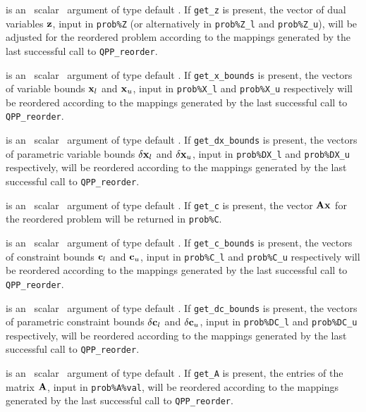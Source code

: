 \documentclass{galahad}
\newcommand{\packagename}{QPP}
\begin{document}
\begin{description}
is an \optional\ scalar \intentin\ argument of type default \logical. 
If {\tt get\_z} is present, the vector of dual variables ${\mathbf{z}}$, input in 
{\tt prob\%Z} (or alternatively in {\tt prob\%Z\_l} and {\tt prob\%Z\_u}),
will be adjusted for the reordered problem according 
to the mappings generated by the last successful 
call to {\tt \packagename\_reorder}. 
 
is an \optional\ scalar \intentin\ argument of type default \logical. 
If {\tt get\_x\_bounds} is present, 
the vectors of variable bounds ${\mathbf{x}}_l$ and 
${\mathbf{x}}_u$, input in {\tt prob\%X\_l} and {\tt prob\%X\_u} respectively
will be reordered according to the 
mappings generated by the last successful call to {\tt \packagename\_reorder}. 
 
is an \optional\ scalar \intentin\ argument of type default \logical. 
If {\tt get\_dx\_bounds} is present, 
the vectors of parametric variable bounds $\delta {\mathbf{x}}_l$ and 
$\delta {\mathbf{x}}_u$, input in {\tt prob\%DX\_l} and {\tt prob\%DX\_u} respectively,
will be reordered according to the 
mappings generated by the last successful call to {\tt \packagename\_reorder}. 
 
is an \optional\ scalar \intentin\ argument of type default \logical. 
If {\tt get\_c} is present, the vector ${\mathbf{A}} {\mathbf{x}}$ for the reordered problem 
will be returned in {\tt prob\%C}. 
 
is an \optional\ scalar \intentin\ argument of type default \logical. 
If {\tt get\_c\_bounds} is present, 
the vectors of constraint bounds ${\mathbf{c}}_l$ and 
${\mathbf{c}}_u$, input in {\tt prob\%C\_l} and {\tt prob\%C\_u} respectively
will be reordered according to the 
mappings generated by the last successful call to {\tt \packagename\_reorder}. 
 
is an \optional\ scalar \intentin\ argument of type default \logical. 
If {\tt get\_dc\_bounds} is present, 
the vectors of parametric constraint bounds $\delta {\mathbf{c}}_l$ and 
$\delta {\mathbf{c}}_u$, input in {\tt prob\%DC\_l} and {\tt prob\%DC\_u} respectively,
will be reordered according to the 
mappings generated by the last successful call to {\tt \packagename\_reorder}. 
 
is an \optional\ scalar \intentin\ argument of type default \logical. 
If {\tt get\_A} is present, the entries of the 
matrix ${\mathbf{A}}$, input in {\tt prob\%A\%val}, will be reordered according to the 
mappings generated by the last successful call to {\tt \packagename\_reorder}. 
 

\end{description}
\end{document}
